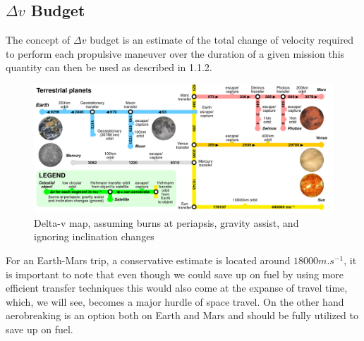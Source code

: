 \documentclass[12pt,a4paper]{report}
\begin{document}
\subsection{$\Delta v$ Budget}
The concept of $\Delta v$ budget is an estimate of the total change of velocity required to perform each propulsive maneuver over the duration of a given mission this quantity can then be used as described in 1.1.2.\\
\begin{figure}[hbtp]
\centering
\includegraphics[scale=.2]{img/dv.png}
\caption{Delta-v map, assuming burns at periapsis, gravity assist, and ignoring inclination changes}
\end{figure}

For an Earth-Mars trip, a conservative estimate is located around $18000m.s^{-1}$, it is important to note that even though we could save up on fuel by using more efficient transfer techniques this would also come at the expanse of travel time, which, we will see, becomes a major hurdle of space travel. On the other hand aerobreaking is an option both on Earth and Mars and should be fully utilized to save up on fuel.
\newpage
\end{document}
